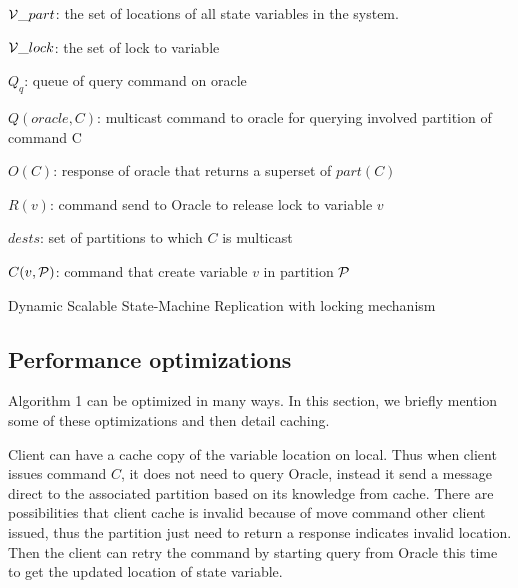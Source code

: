 \begin{algorithm}
\begin{distribalgo}[1]
\vspace{1mm}

$\mathcal{V}\_part$: the set of locations of all state variables in the system.

\vspace{1mm}

$\mathcal{V}\_lock$: the set of lock to variable 

\vspace{1mm}

$Q_q$: queue of query command on oracle

\vspace{1mm}

$Q(oracle, C)$: multicast command to oracle for querying involved partition of command C

\vspace{1mm}

$O(C)$: response of oracle that returns a superset of $part(C)$

\vspace{1mm}

$R(v)$: command send to Oracle to release lock to variable $v$

\vspace{1mm}

$dests$: set of partitions to which $C$ is multicast

\vspace{1mm}

$C(v, \mathcal{P})$: command that create variable $v$ in partition $\mathcal{P}$

\caption{Dynamic Scalable State-Machine Replication with locking mechanism}
\label{alg:dssmr}
\end{distribalgo}
\end{algorithm}

\subsection{Performance optimizations}
\label{sec:optm}

Algorithm 1 can be optimized in many ways. In this section, we briefly mention some of these optimizations and then detail caching.

Client can have a cache copy of the variable location on local. Thus when client issues command $C$, it does not need to query Oracle, instead it send a message direct to the associated partition based on its knowledge from cache. There are possibilities that client cache is invalid because of move command other client issued, thus the partition just need to return a response indicates invalid location. Then the client can retry the command by starting query from Oracle this time to get the updated location of state variable. 

